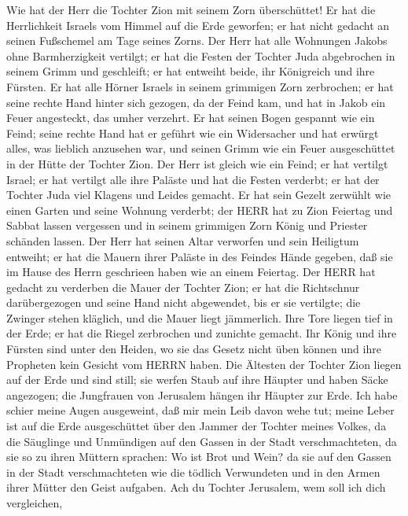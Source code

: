  Wie hat der Herr die Tochter Zion mit seinem Zorn
überschüttet! Er hat die Herrlichkeit Israels vom Himmel auf die Erde
geworfen; er hat nicht gedacht an seinen Fußschemel am Tage seines
Zorns.  Der Herr hat alle Wohnungen Jakobs ohne
Barmherzigkeit vertilgt; er hat die Festen der Tochter Juda abgebrochen
in seinem Grimm und geschleift; er hat entweiht beide, ihr Königreich
und ihre Fürsten.  Er hat alle Hörner Israels in seinem
grimmigen Zorn zerbrochen; er hat seine rechte Hand hinter sich gezogen,
da der Feind kam, und hat in Jakob ein Feuer angesteckt, das umher
verzehrt.  Er hat seinen Bogen gespannt wie ein Feind; seine
rechte Hand hat er geführt wie ein Widersacher und hat erwürgt alles,
was lieblich anzusehen war, und seinen Grimm wie ein Feuer ausgeschüttet
in der Hütte der Tochter Zion.  Der Herr ist gleich wie ein
Feind; er hat vertilgt Israel; er hat vertilgt alle ihre Paläste und hat
die Festen verderbt; er hat der Tochter Juda viel Klagens und Leides
gemacht.  Er hat sein Gezelt zerwühlt wie einen Garten und
seine Wohnung verderbt; der HERR hat zu Zion Feiertag und Sabbat lassen
vergessen und in seinem grimmigen Zorn König und Priester schänden
lassen.  Der Herr hat seinen Altar verworfen und sein
Heiligtum entweiht; er hat die Mauern ihrer Paläste in des Feindes Hände
gegeben, daß sie im Hause des Herrn geschrieen haben wie an einem
Feiertag.  Der HERR hat gedacht zu verderben die Mauer der
Tochter Zion; er hat die Richtschnur darübergezogen und seine Hand nicht
abgewendet, bis er sie vertilgte; die Zwinger stehen kläglich, und die
Mauer liegt jämmerlich.  Ihre Tore liegen tief in der Erde;
er hat die Riegel zerbrochen und zunichte gemacht. Ihr König und ihre
Fürsten sind unter den Heiden, wo sie das Gesetz nicht üben können und
ihre Propheten kein Gesicht vom HERRN haben.  Die Ältesten
der Tochter Zion liegen auf der Erde und sind still; sie werfen Staub
auf ihre Häupter und haben Säcke angezogen; die Jungfrauen von Jerusalem
hängen ihr Häupter zur Erde.  Ich habe schier meine Augen
ausgeweint, daß mir mein Leib davon wehe tut; meine Leber ist auf die
Erde ausgeschüttet über den Jammer der Tochter meines Volkes, da die
Säuglinge und Unmündigen auf den Gassen in der Stadt verschmachteten,
 da sie so zu ihren Müttern sprachen: Wo ist Brot und Wein?
da sie auf den Gassen in der Stadt verschmachteten wie die tödlich
Verwundeten und in den Armen ihrer Mütter den Geist aufgaben.
 Ach du Tochter Jerusalem, wem soll ich dich vergleichen,

